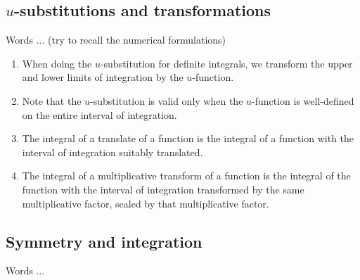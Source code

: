 \documentclass{amsart}
\begin{document}
\subsection{$u$-substitutions and transformations}

Words ... (try to recall the numerical formulations)

\begin{enumerate}
\item When doing the $u$-substitution for definite integrals, we
  transform the upper and lower limits of integration by the
  $u$-function.
\item Note that the $u$-substitution is valid only when the
  $u$-function is well-defined on the entire interval of integration.
\item The integral of a translate of a function is the integral of a
  function with the interval of integration suitably translated.
\item The integral of a multiplicative transform of a function is the
  integral of the function with the interval of integration
  transformed by the same multiplicative factor, scaled by that
  multiplicative factor.
\end{enumerate}

\subsection{Symmetry and integration}

Words ...
\end{document}
